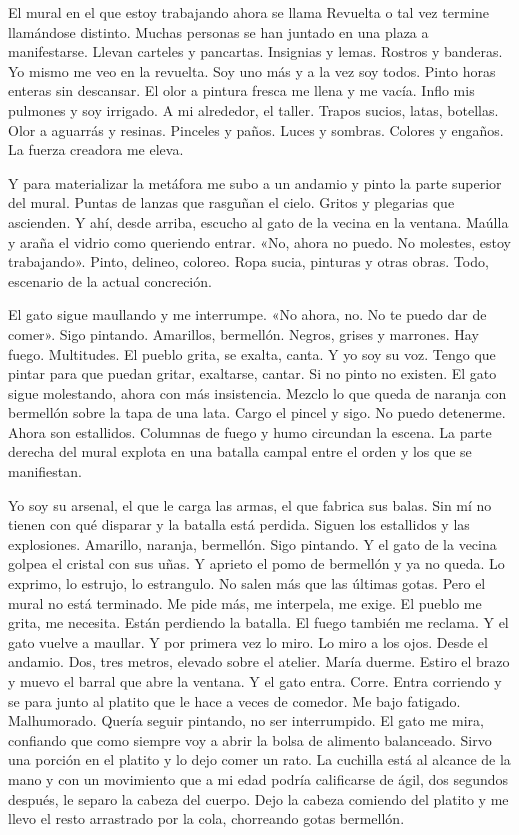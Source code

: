 \documentclass[11pt,twoside,openright,a5paper]{book}
\begin{document}
El mural en el que estoy trabajando ahora se llama Revuelta o tal vez termine llamándose distinto. Muchas personas se han juntado en una plaza a manifestarse. Llevan carteles y pancartas. Insignias y lemas. Rostros y banderas. Yo mismo me veo en la revuelta. Soy uno más y a la vez soy todos. Pinto horas enteras sin descansar. El olor a pintura fresca me llena y me vacía. Inflo mis pulmones y soy irrigado. A mi alrededor, el taller. Trapos sucios, latas, botellas. Olor a aguarrás y resinas. Pinceles y paños. Luces y sombras. Colores y engaños. La fuerza creadora me eleva. 

Y para materializar la metáfora me subo a un andamio y pinto la parte superior del mural. Puntas de lanzas que rasguñan el cielo. Gritos y plegarias que ascienden. Y ahí, desde arriba, escucho al gato de la vecina en la ventana. Maúlla y araña el vidrio como queriendo entrar. «No, ahora no puedo. No molestes, estoy trabajando». Pinto, delineo, coloreo. Ropa sucia, pinturas y otras obras. Todo, escenario de la actual concreción. 

El gato sigue maullando y me interrumpe. «No ahora, no. No te puedo dar de comer». Sigo pintando. Amarillos, bermellón. Negros, grises y marrones. Hay fuego. Multitudes. El pueblo grita, se exalta, canta. Y yo soy su voz. Tengo que pintar para que puedan gritar, exaltarse, cantar. Si no pinto no existen. El gato sigue molestando, ahora con más insistencia. Mezclo lo que queda de naranja con bermellón sobre la tapa de una lata. Cargo el pincel y sigo. No puedo detenerme. Ahora son estallidos. Columnas de fuego y humo circundan la escena. La parte derecha del mural explota en una batalla campal entre el orden y los que se manifiestan. 

Yo soy su arsenal, el que le carga las armas, el que fabrica sus balas. Sin mí no tienen con qué disparar y la batalla está perdida. Siguen los estallidos y las explosiones. Amarillo, naranja, bermellón. Sigo pintando. Y el gato de la vecina golpea el cristal con sus uñas. Y aprieto el pomo de bermellón y ya no queda. Lo exprimo, lo estrujo, lo estrangulo. No salen más que las últimas gotas. Pero el mural no está terminado. Me pide más, me interpela, me exige. El pueblo me grita, me necesita. Están perdiendo la batalla. El fuego también me reclama. Y el gato vuelve a maullar. Y por primera vez lo miro. Lo miro a los ojos. Desde el andamio. Dos, tres metros, elevado sobre el atelier. María duerme. Estiro el brazo y muevo el barral que abre la ventana. Y el gato entra. Corre. Entra corriendo y se para junto al platito que le hace a veces de comedor. Me bajo fatigado. Malhumorado. Quería seguir pintando, no ser interrumpido. El gato me mira, confiando que como siempre voy a abrir la bolsa de alimento balanceado. Sirvo una porción en el platito y lo dejo comer un rato. La cuchilla está al alcance de la mano y con un movimiento que a mi edad podría calificarse de ágil, dos segundos después, le separo la cabeza del cuerpo. Dejo la cabeza comiendo del platito y me llevo el resto arrastrado por la cola, chorreando gotas bermellón.
\end{document}

